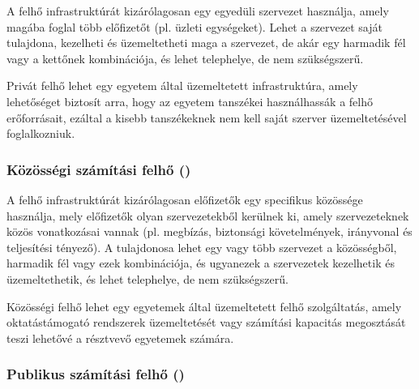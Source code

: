 A felhő infrastruktúrát kizárólagosan egy egyedüli szervezet használja, amely magába foglal több előfizetőt (pl. üzleti egységeket). Lehet a szervezet saját tulajdona, kezelheti és üzemeltetheti maga a szervezet, de akár egy harmadik fél vagy a kettőnek kombinációja, és lehet telephelye, de nem szükségszerű.

Privát felhő lehet egy egyetem által üzemeltetett infrastruktúra, amely lehetőséget biztosít arra, hogy az egyetem tanszékei használhassák a felhő erőforrásait, ezáltal a kisebb tanszékeknek nem kell saját szerver üzemeltetésével foglalkozniuk.

\subsubsection{Közösségi számítási felhő ()}

A felhő infrastruktúrát kizárólagosan előfizetők egy specifikus közössége használja, mely előfizetők olyan szervezetekből kerülnek ki, amely szervezeteknek közös vonatkozásai vannak (pl. megbízás, biztonsági követelmények, irányvonal és teljesítési tényező). A tulajdonosa lehet egy vagy több szervezet a közösségből, harmadik fél vagy ezek kombinációja, és ugyanezek a szervezetek kezelhetik és üzemeltethetik, és lehet telephelye, de nem szükségszerű.

Közösségi felhő lehet egy egyetemek által üzemeltetett felhő szolgáltatás, amely oktatástámogató rendszerek üzemeltetését vagy számítási kapacitás megosztását teszi lehetővé a résztvevő egyetemek számára. 

\subsubsection{Publikus számítási felhő ()}

